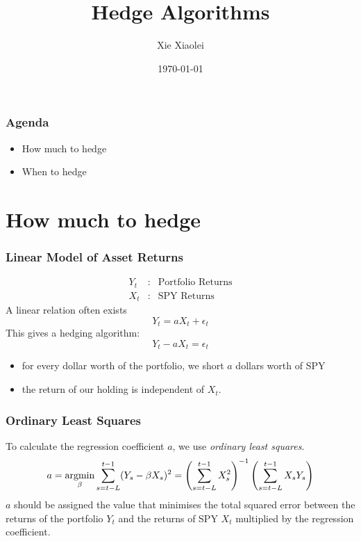 \documentclass{beamer}
\title{Hedge Algorithms}
\author{Xie Xiaolei} %
\institute[UCPH] %
{
Atenvia Asset Management \\ %
\medskip
\textit{xiaolei.xie@atenvia.com} %
}
\date{\today} %
\begin{document}
\begin{frame}
\titlepage %
\end{frame}


\begin{frame}
  \frametitle{Agenda}
  \begin{itemize}
  \item How much to hedge
  \item When to hedge
  \end{itemize}
\end{frame}

\section{How much to hedge}
\begin{frame}
  \frametitle{Linear Model of Asset Returns}
  \begin{eqnarray*}
    Y_t &:& \text{Portfolio Returns} \\
    X_t &:& \text{SPY Returns}
  \end{eqnarray*}
  A linear relation often exists
  \[
    Y_t = a X_t + \epsilon_t  
  \]
  This gives a hedging algorithm:
  \[
    Y_t - a X_t = \epsilon_t    
  \]
  \begin{itemize}
  \item for every dollar worth of the portfolio, we short $a$ dollars worth of SPY
  \item the return of our holding is independent of $X_t$.
  \end{itemize}
\end{frame}

\begin{frame}
  \frametitle{Ordinary Least Squares}
  To calculate the regression coefficient $a$, we use {\it ordinary
    least squares}.
  \begin{equation*}
    a = \operatorname*{argmin}_{\beta} \sum_{s=t-L}^{t-1} (Y_s - \beta X_s)^2
    =
    \left(
      \sum_{s=t-L}^{t-1} X_s^2
    \right)^{-1}
    \left(
      \sum_{s=t-L}^{t-1} X_s Y_s
    \right)
  \end{equation*}
  $a$ should be assigned the value that minimises the total squared
  error between the returns of the portfolio $Y_t$ and the returns of
  SPY $X_t$ multiplied by the regression coefficient.
\end{frame}
\end{document}
